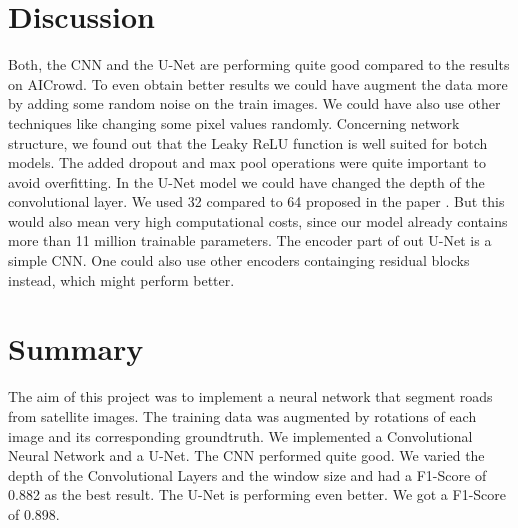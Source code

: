 \documentclass[10pt,conference,compsocconf]{IEEEtran}
\begin{document}
\vspace{0.5cm}
\section{Discussion}
\vspace{0.3cm}
Both, the CNN and the U-Net are performing quite good compared to the results on AICrowd. To even obtain better results we could have augment the data more by adding some random noise on the train images. We could have also use other techniques like changing some pixel values randomly. 
Concerning network structure, we found out that the Leaky ReLU function is well suited for botch models. The added dropout and max pool operations were quite important to avoid overfitting. In the U-Net model we could have changed the depth of the convolutional layer. We used 32 compared to 64 proposed in the paper \cite{unet}. But this would also mean very high computational costs, since our model already contains more than 11 million trainable parameters. The encoder part of out U-Net is a simple CNN. One could also use other encoders containging residual blocks instead, which might perform better.

\vspace{0.5cm}
\section{Summary}
\vspace{0.3cm}
The aim of this project was to implement a neural network that segment roads from satellite images. The training data was augmented by rotations of each image and its corresponding groundtruth. We implemented a Convolutional Neural Network and a U-Net. The CNN performed quite good. We varied the depth of the Convolutional Layers and the window size and had a F1-Score of 0.882 as the best result. The U-Net is performing even better. We got a F1-Score of 0.898.  




\vspace{1cm}


\end{document}
